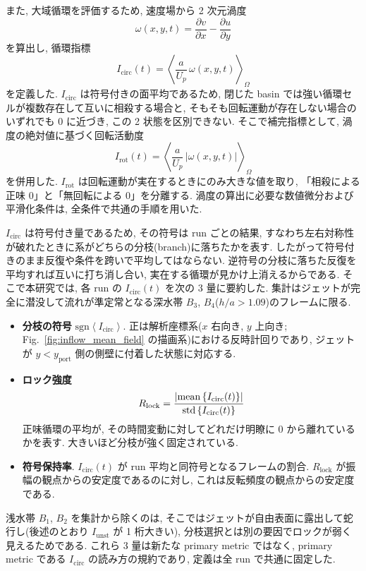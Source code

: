また, 大域循環を評価するため, 速度場から 2 次元渦度
\begin{equation}
\omega(x,y,t)=\frac{\partial v}{\partial x}-\frac{\partial u}{\partial y}
\label{eq:vorticity}
\end{equation}
を算出し, 循環指標
\begin{equation}
I_{\mathrm{circ}}(t)=
\left\langle \frac{a}{U_p}\,\omega(x,y,t) \right\rangle_{\Omega}
\label{eq:Icirc}
\end{equation}
を定義した. $I_{\mathrm{circ}}$ は符号付きの面平均であるため, 閉じた basin では強い循環セルが複数存在して互いに相殺する場合と, そもそも回転運動が存在しない場合のいずれでも 0 に近づき, この 2 状態を区別できない. そこで補完指標として, 渦度の絶対値に基づく回転活動度
\begin{equation}
I_{\mathrm{rot}}(t)=
\left\langle \frac{a}{U_p}\,\left|\omega(x,y,t)\right| \right\rangle_{\Omega}
\label{eq:Irot}
\end{equation}
を併用した. $I_{\mathrm{rot}}$ は回転運動が実在するときにのみ大きな値を取り, 「相殺による正味 0」と「無回転による 0」を分離する. 渦度の算出に必要な数値微分および平滑化条件は, 全条件で共通の手順を用いた.

$I_{\mathrm{circ}}$ は符号付き量であるため, その符号は run ごとの結果, すなわち左右対称性が破れたときに系がどちらの分枝(branch)に落ちたかを表す. したがって符号付きのまま反復や条件を跨いで平均してはならない. 逆符号の分枝に落ちた反復を平均すれば互いに打ち消し合い, 実在する循環が見かけ上消えるからである. そこで本研究では, 各 run の $I_{\mathrm{circ}}(t)$ を次の 3 量に要約した. 集計はジェットが完全に潜没して流れが準定常となる深水帯 $B_3$, $B_4$($h/a>1.09$)のフレームに限る.
\begin{itemize}
  \item \textbf{分枝の符号} $\mathrm{sgn}\left\langle I_{\mathrm{circ}}\right\rangle$. 正は解析座標系($x$ 右向き, $y$ 上向き; Fig.~\ref{fig:inflow_mean_field} の描画系)における反時計回りであり, ジェットが $y<y_{\mathrm{port}}$ 側の側壁に付着した状態に対応する.
  \item \textbf{ロック強度}
  \begin{equation}
  R_{\mathrm{lock}}=
  \frac{\lvert \mathrm{mean}\left\{I_{\mathrm{circ}}(t)\right\} \rvert}
       {\mathrm{std}\left\{I_{\mathrm{circ}}(t)\right\}}
  \label{eq:Rlock}
  \end{equation}
  正味循環の平均が, その時間変動に対してどれだけ明瞭に 0 から離れているかを表す. 大きいほど分枝が強く固定されている.
  \item \textbf{符号保持率}. $I_{\mathrm{circ}}(t)$ が run 平均と同符号となるフレームの割合. $R_{\mathrm{lock}}$ が振幅の観点からの安定度であるのに対し, これは反転頻度の観点からの安定度である.
\end{itemize}
浅水帯 $B_1$, $B_2$ を集計から除くのは, そこではジェットが自由表面に露出して蛇行し(後述のとおり $I_{\mathrm{unst}}$ が 1 桁大きい), 分枝選択とは別の要因でロックが弱く見えるためである. これら 3 量は新たな primary metric ではなく, primary metric である $I_{\mathrm{circ}}$ の読み方の規約であり, 定義は全 run で共通に固定した.

